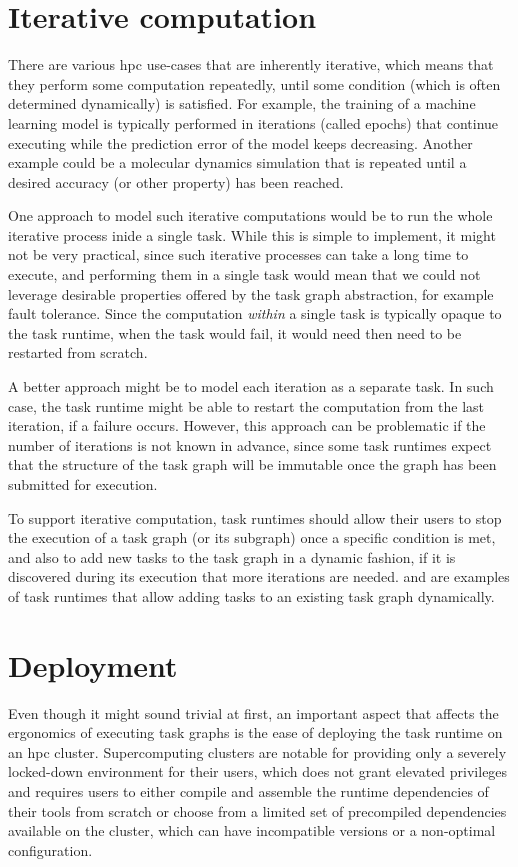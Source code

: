 \section{Iterative computation}
There are various \gls{hpc} use-cases that are inherently iterative, which means
that they perform some computation repeatedly, until some condition (which is often determined
dynamically) is satisfied. For example, the training of a machine learning model is typically
performed in iterations (called epochs) that continue executing while the prediction error of the
model keeps decreasing. Another example could be a molecular dynamics simulation that is repeated
until a desired accuracy (or other property) has been reached.

One approach to model such iterative computations would be to run the whole iterative process inide
a single task. While this is simple to implement, it might not be very practical, since such
iterative processes can take a long time to execute, and performing them in a single task would
mean that we could not leverage desirable properties offered by the task graph abstraction, for
example fault tolerance. Since the computation \emph{within} a single task is
typically opaque to the task runtime, when the task would fail, it would need then need to be
restarted from scratch.

A better approach might be to model each iteration as a separate task. In such case, the task
runtime might be able to restart the computation from the last iteration, if a failure occurs.
However, this approach can be problematic if the number of iterations is not known in advance,
since some task runtimes expect that the structure of the task graph will be immutable once the
graph has been submitted for execution.

To support iterative computation, task runtimes should allow their users to stop the execution of a
task graph (or its subgraph) once a specific condition is met, and also to add new tasks to the
task graph in a dynamic fashion, if it is discovered during its execution that more iterations are
needed. \dask{} and \ray{} are examples of task runtimes
that allow adding tasks to an existing task graph dynamically.

\section{Deployment}
Even though it might sound trivial at first, an important aspect that affects the ergonomics of
executing task graphs is the ease of deploying the task runtime on an \gls{hpc}
cluster. Supercomputing clusters are notable for providing only a severely locked-down environment
for their users, which does not grant elevated privileges and requires users to either compile and
assemble the runtime dependencies of their tools from scratch or choose from a limited set of
precompiled dependencies available on the cluster, which can have incompatible versions or a
non-optimal configuration.

